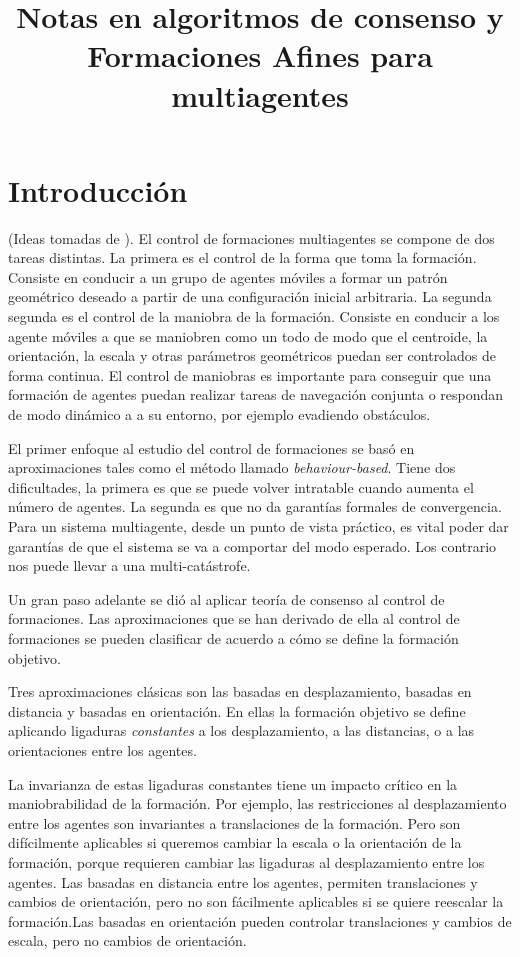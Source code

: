\documentclass[10pt,a4paper]{article}
\title{Notas en algoritmos de consenso y Formaciones Afines para multiagentes}
\begin{document}
\section{Introducción}
(Ideas tomadas de \cite{zhao2018}).
El control de formaciones multiagentes se compone de dos tareas distintas. La primera es el control de la forma que toma la formación. Consiste en conducir a un grupo de agentes móviles a formar un patrón geométrico deseado a partir de una configuración inicial arbitraria. La segunda segunda es el control de la maniobra de la formación. Consiste en conducir a los agente móviles a que se maniobren como un todo de modo que el centroide, la orientación, la escala y otras parámetros geométricos puedan ser controlados de forma continua. El control de maniobras es importante para conseguir que una formación de agentes puedan realizar tareas de navegación conjunta o respondan de modo dinámico a a su entorno, por ejemplo evadiendo obstáculos.

El primer enfoque al estudio del control de formaciones se basó en aproximaciones tales como el método llamado \emph{behaviour-based}. Tiene dos dificultades, la primera es que se puede volver intratable cuando aumenta el número de agentes. La segunda es que no da garantías formales de convergencia. Para un sistema multiagente, desde un punto de vista práctico, es vital poder dar garantías de que el sistema se va a comportar del modo esperado. Los contrario nos puede llevar a una multi-catástrofe.

Un gran paso adelante se dió al aplicar teoría de consenso al control de formaciones. Las aproximaciones que se han derivado de ella al control de formaciones se pueden clasificar de acuerdo a cómo se define la formación objetivo.

Tres aproximaciones clásicas son las basadas en desplazamiento, basadas en distancia y basadas en orientación. En ellas la formación objetivo se define aplicando ligaduras \emph{constantes} a los desplazamiento, a las distancias, o a las orientaciones entre los agentes.

La invarianza de estas ligaduras constantes tiene un impacto crítico en la maniobrabilidad de la formación. Por ejemplo, las restricciones al desplazamiento entre los agentes son invariantes a translaciones de la formación. Pero son difícilmente aplicables si queremos cambiar la escala o la orientación de la formación, porque requieren cambiar las ligaduras al desplazamiento entre los agentes. Las basadas en distancia entre los agentes, permiten translaciones y cambios de orientación, pero no son fácilmente aplicables si se quiere reescalar la formación.Las basadas en orientación pueden controlar translaciones y cambios de escala, pero no cambios de orientación.
\end{document}
